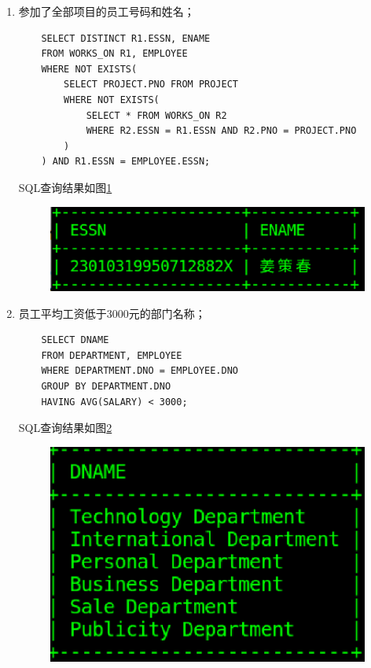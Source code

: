 \documentclass{ML}
\begin{document}
\begin{enumerate}
    \item 参加了全部项目的员工号码和姓名；
    \begin{verbatim}
    SELECT DISTINCT R1.ESSN, ENAME 
    FROM WORKS_ON R1, EMPLOYEE
    WHERE NOT EXISTS(
        SELECT PROJECT.PNO FROM PROJECT
        WHERE NOT EXISTS(
            SELECT * FROM WORKS_ON R2
            WHERE R2.ESSN = R1.ESSN AND R2.PNO = PROJECT.PNO
        )
    ) AND R1.ESSN = EMPLOYEE.ESSN;
    \end{verbatim}
    SQL查询结果如图\ref{fig:6}
    \begin{figure}[htb]
        \centering
        \includegraphics[scale=0.4, bb=0 0 383 103]{media/3.1.6.eps}
        \caption{}\label{fig:6}
    \end{figure}
    \item 员工平均工资低于3000元的部门名称；
    \begin{verbatim}
    SELECT DNAME
    FROM DEPARTMENT, EMPLOYEE
    WHERE DEPARTMENT.DNO = EMPLOYEE.DNO
    GROUP BY DEPARTMENT.DNO
    HAVING AVG(SALARY) < 3000;
    \end{verbatim}
    SQL查询结果如图\ref{fig:7}
    \begin{figure}[htb]
        \centering
        \includegraphics[scale=0.4, bb=0 0 311 210]{media/3.1.7.eps}
        \caption{}\label{fig:7}
    \end{figure}

\end{enumerate}
\end{document}
